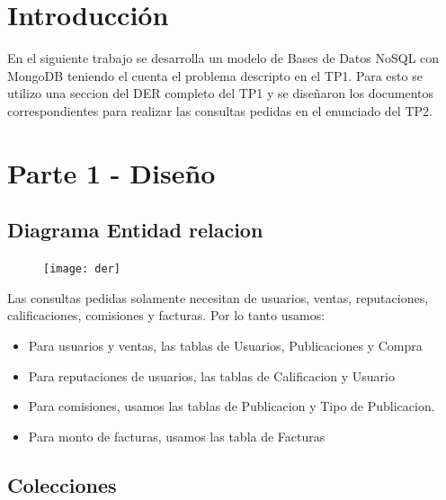 \documentclass[a4paper, 10pt, twoside]{article}
\begin{document}
\newpage




\section{Introducción}

En el siguiente trabajo se desarrolla un modelo de Bases de Datos NoSQL con MongoDB teniendo el cuenta el problema descripto en el TP1.
Para esto se utilizo una seccion del DER completo del TP1 y se diseñaron los documentos correspondientes para realizar las consultas pedidas en el enunciado del TP2.

\section{Parte 1 - Diseño}

\subsection{Diagrama Entidad relacion}

\begin{figure}[h]
\texttt{[image: der]}
\end{figure}

Las consultas pedidas solamente necesitan de usuarios, ventas, reputaciones, calificaciones, comisiones y facturas. Por lo tanto usamos:

\begin{itemize}
\item Para usuarios y ventas, las tablas de Usuarios, Publicaciones y Compra
\item Para reputaciones de usuarios, las tablas de Calificacion y Usuario
\item Para comisiones, usamos las tablas de Publicacion y Tipo de Publicacion.
\item Para monto de facturas, usamos las tabla de Facturas
\end{itemize}

\newpage
\subsection{Colecciones}
\end{document}
